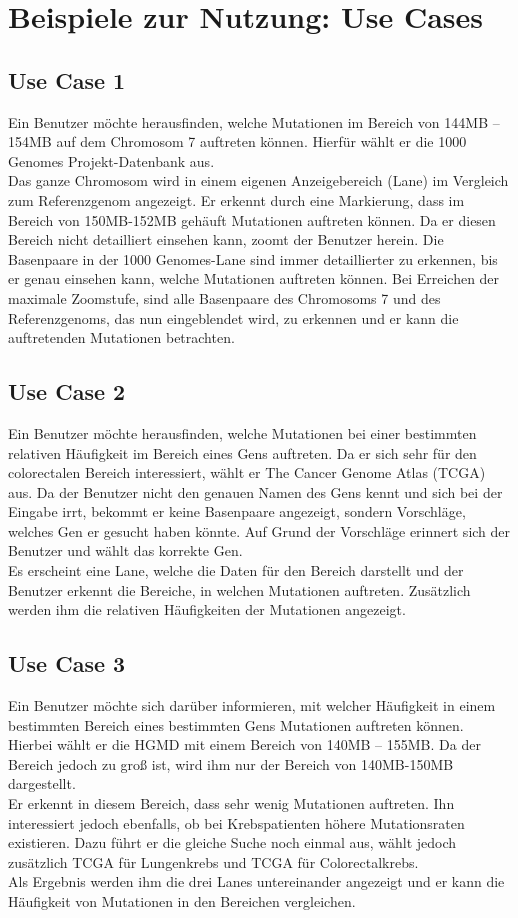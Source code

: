 \newpage
\section{Beispiele zur Nutzung: Use Cases}
\subsection{Use Case 1}
Ein Benutzer möchte herausfinden, welche Mutationen im Bereich von 144MB – 154MB auf dem Chromosom 7 auftreten können. Hierfür wählt er die 1000 Genomes Projekt-Datenbank aus. \\
Das ganze Chromosom wird in einem eigenen Anzeigebereich (Lane) im Vergleich zum Referenzgenom angezeigt. Er erkennt durch eine Markierung, dass im Bereich von 150MB-152MB gehäuft Mutationen auftreten können. Da er diesen Bereich nicht detailliert einsehen kann, zoomt der Benutzer herein. Die Basenpaare in der 1000 Genomes-Lane sind immer detaillierter zu erkennen, bis er genau einsehen kann, welche Mutationen auftreten können. Bei Erreichen der maximale Zoomstufe, sind alle Basenpaare des Chromosoms 7 und des Referenzgenoms, das nun eingeblendet wird, zu erkennen und er kann die auftretenden Mutationen betrachten.
\subsection{Use Case 2}
Ein Benutzer möchte herausfinden, welche Mutationen bei einer bestimmten relativen Häufigkeit im Bereich eines Gens auftreten. Da er sich sehr für den colorectalen Bereich interessiert, wählt er The Cancer Genome Atlas (TCGA) aus. Da der Benutzer nicht den genauen Namen des Gens kennt und sich bei der Eingabe irrt, bekommt er keine Basenpaare angezeigt, sondern Vorschläge, welches Gen er gesucht haben könnte. Auf Grund der Vorschläge erinnert sich der Benutzer und wählt das korrekte Gen. \\
Es erscheint eine Lane, welche die Daten für den Bereich darstellt und der Benutzer erkennt die Bereiche, in welchen Mutationen auftreten. Zusätzlich werden ihm die relativen Häufigkeiten der Mutationen angezeigt.
\subsection{Use Case 3}
Ein Benutzer möchte sich darüber informieren, mit welcher Häufigkeit in einem bestimmten Bereich eines bestimmten Gens Mutationen auftreten können. Hierbei wählt er die HGMD mit einem Bereich von 140MB – 155MB. Da der Bereich jedoch zu groß ist,
wird ihm nur der Bereich von 140MB-150MB dargestellt. \\
Er erkennt in diesem Bereich, dass sehr wenig Mutationen auftreten. Ihn interessiert jedoch ebenfalls, ob bei Krebspatienten höhere Mutationsraten existieren. Dazu führt er die gleiche Suche noch einmal aus, wählt jedoch zusätzlich TCGA für Lungenkrebs und TCGA für Colorectalkrebs. \\
Als Ergebnis werden ihm die drei Lanes untereinander angezeigt und er kann die Häufigkeit von Mutationen in den Bereichen vergleichen.

